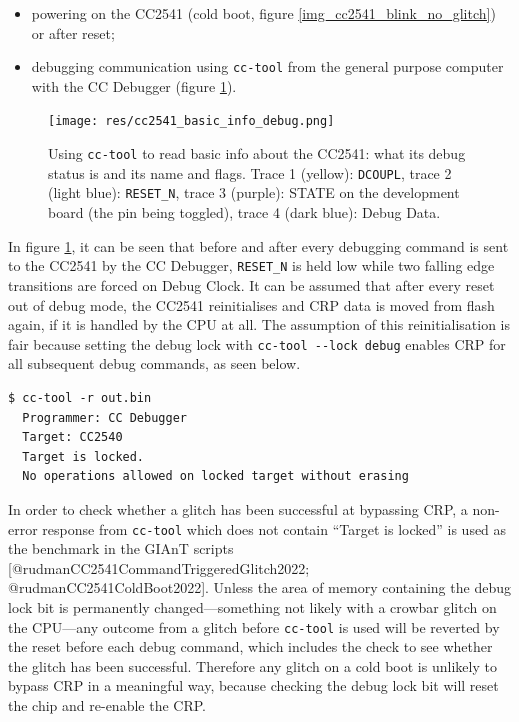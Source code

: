 \begin{itemize}
\tightlist
\item
  powering on the CC2541 (cold boot, figure
  \ref{img_cc2541_blink_no_glitch}) or after reset;
\item
  debugging communication using \texttt{cc-tool} from the general
  purpose computer with the CC Debugger (figure
  \ref{img_cc2541_debugging}).
\end{itemize}

\begin{figure}
\centering
\texttt{[image: res/cc2541\_basic\_info\_debug.png]}
\caption{Using \texttt{cc-tool} to read basic info about the CC2541:
what its debug status is and its name and flags. Trace 1 (yellow):
\texttt{DCOUPL}, trace 2 (light blue): \texttt{RESET\_N}, trace 3
(purple): STATE on the development board (the pin being toggled), trace
4 (dark blue): Debug Data. \label{img_cc2541_debugging}}
\end{figure}

\newpage

In figure \ref{img_cc2541_debugging}, it can be seen that before and
after every debugging command is sent to the CC2541 by the CC Debugger,
\texttt{RESET\_N} is held low while two falling edge transitions are
forced on Debug Clock. It can be assumed that after every reset out of
debug mode, the CC2541 reinitialises and CRP data is moved from flash
again, if it is handled by the CPU at all. The assumption of this
reinitialisation is fair because setting the debug lock with
\texttt{cc-tool\ -\/-lock\ debug} enables CRP for all subsequent debug
commands, as seen below.

\begin{verbatim}
$ cc-tool -r out.bin
  Programmer: CC Debugger
  Target: CC2540
  Target is locked.
  No operations allowed on locked target without erasing
\end{verbatim}

In order to check whether a glitch has been successful at bypassing CRP,
a non-error response from \texttt{cc-tool} which does not contain
``Target is locked'' is used as the benchmark in the GIAnT scripts
{[}@rudmanCC2541CommandTriggeredGlitch2022;
@rudmanCC2541ColdBoot2022{]}. Unless the area of memory containing the
debug lock bit is permanently changed---something not likely with a
crowbar glitch on the CPU---any outcome from a glitch before
\texttt{cc-tool} is used will be reverted by the reset before each debug
command, which includes the check to see whether the glitch has been
successful. Therefore any glitch on a cold boot is unlikely to bypass
CRP in a meaningful way, because checking the debug lock bit will reset
the chip and re-enable the CRP.

